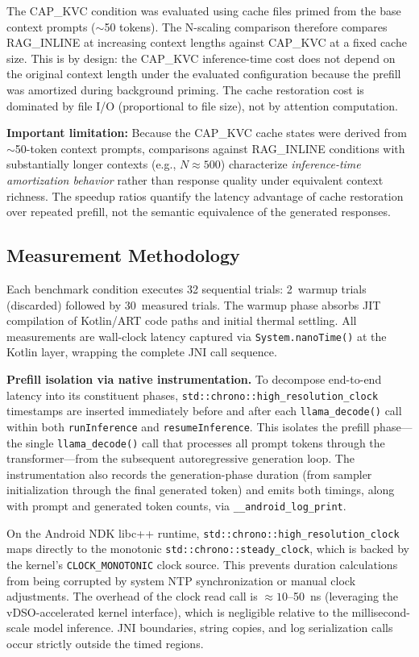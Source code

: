 \documentclass[journal]{IEEEtran}
\begin{document}
The CAP\_KVC condition was evaluated using cache files primed from the base context prompts ($\sim$50 tokens). The N-scaling comparison therefore compares RAG\_INLINE at increasing context lengths against CAP\_KVC at a fixed cache size. This is by design: the CAP\_KVC inference-time cost does not depend on the original context length under the evaluated configuration because the prefill was amortized during background priming. The cache restoration cost is dominated by file I/O (proportional to file size), not by attention computation.

\textbf{Important limitation:} Because the CAP\_KVC cache states were derived from $\sim$50-token context prompts, comparisons against RAG\_INLINE conditions with substantially longer contexts (e.g., $N \approx 500$) characterize \emph{inference-time amortization behavior} rather than response quality under equivalent context richness. The speedup ratios quantify the latency advantage of cache restoration over repeated prefill, not the semantic equivalence of the generated responses.

\subsection{Measurement Methodology}
\label{sec:measurement}

Each benchmark condition executes 32 sequential trials: 2~warmup trials (discarded) followed by 30~measured trials. The warmup phase absorbs JIT compilation of Kotlin/ART code paths and initial thermal settling. All measurements are wall-clock latency captured via \texttt{System.nanoTime()} at the Kotlin layer, wrapping the complete JNI call sequence.

\textbf{Prefill isolation via native instrumentation.} To decompose end-to-end latency into its constituent phases, \texttt{std::chrono::high\_resolution\_clock} timestamps are inserted immediately before and after each \texttt{llama\_decode()} call within both \texttt{runInference} and \texttt{resumeInference}. This isolates the prefill phase---the single \texttt{llama\_decode()} call that processes all prompt tokens through the transformer---from the subsequent autoregressive generation loop. The instrumentation also records the generation-phase duration (from sampler initialization through the final generated token) and emits both timings, along with prompt and generated token counts, via \texttt{\_\_android\_log\_print}. 

On the Android NDK libc++ runtime, \texttt{std::chrono::high\_resolution\_clock} maps directly to the monotonic \texttt{std::chrono::steady\_clock}, which is backed by the kernel's \texttt{CLOCK\_MONOTONIC} clock source. This prevents duration calculations from being corrupted by system NTP synchronization or manual clock adjustments. The overhead of the clock read call is $\approx 10$--50~ns (leveraging the vDSO-accelerated kernel interface), which is negligible relative to the millisecond-scale model inference. JNI boundaries, string copies, and log serialization calls occur strictly outside the timed regions.
\end{document}
